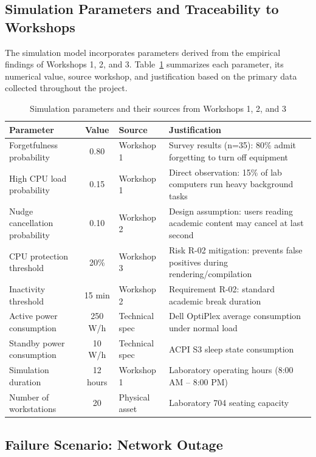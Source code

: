 \documentclass[12pt,a4paper]{article}
\begin{document}
\subsection{Simulation Parameters and Traceability to Workshops}

The simulation model incorporates parameters derived from the empirical findings of Workshops 1, 2, and 3. Table~\ref{tab:params} summarizes each parameter, its numerical value, source workshop, and justification based on the primary data collected throughout the project.

\begin{table}[H]
\centering
\caption{Simulation parameters and their sources from Workshops 1, 2, and 3}
\label{tab:params}
\begin{tabular}{|p{3.5cm}|c|p{2cm}|p{4.5cm}|}
\hline
\textbf{Parameter} & \textbf{Value} & \textbf{Source} & \textbf{Justification} \\
\hline
Forgetfulness probability & 0.80 & Workshop 1 & Survey results (n=35): 80\% admit forgetting to turn off equipment \\
\hline
High CPU load probability & 0.15 & Workshop 1 & Direct observation: 15\% of lab computers run heavy background tasks \\
\hline
Nudge cancellation probability & 0.10 & Workshop 2 & Design assumption: users reading academic content may cancel at last second \\
\hline
CPU protection threshold & 20\% & Workshop 3 & Risk R-02 mitigation: prevents false positives during rendering/compilation \\
\hline
Inactivity threshold & 15 min & Workshop 2 & Requirement R-02: standard academic break duration \\
\hline
Active power consumption & 250 W/h & Technical spec & Dell OptiPlex average consumption under normal load \\
\hline
Standby power consumption & 10 W/h & Technical spec & ACPI S3 sleep state consumption \\
\hline
Simulation duration & 12 hours & Workshop 1 & Laboratory operating hours (8:00 AM -- 8:00 PM) \\
\hline
Number of workstations & 20 & Physical asset & Laboratory 704 seating capacity \\
\hline
\end{tabular}
\end{table}

\subsection{Failure Scenario: Network Outage}
\end{document}
